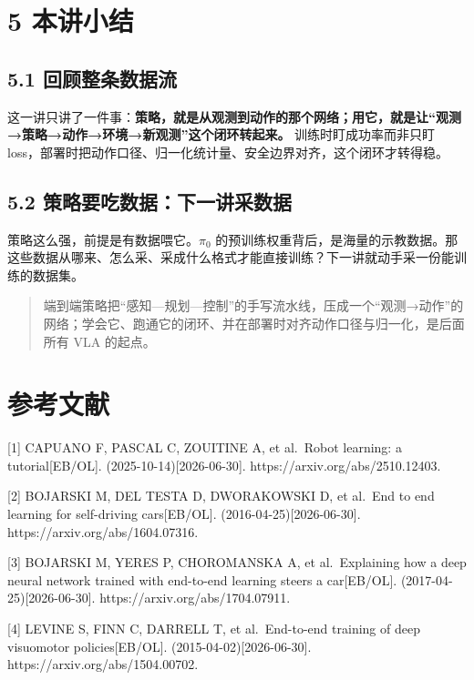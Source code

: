 \documentclass[
  chinese,
]{ctexart}
\begin{document}
\section{5 本讲小结}\label{ux672cux8bb2ux5c0fux7ed3}

\subsection{5.1
回顾整条数据流}\label{ux56deux987eux6574ux6761ux6570ux636eux6d41}

这一讲只讲了一件事：\textbf{策略，就是从观测到动作的那个网络；用它，就是让``观测→策略→动作→环境→新观测''这个闭环转起来。}
训练时盯成功率而非只盯
loss，部署时把动作口径、归一化统计量、安全边界对齐，这个闭环才转得稳。

\subsection{5.2
策略要吃数据：下一讲采数据}\label{ux7b56ux7565ux8981ux5403ux6570ux636eux4e0bux4e00ux8bb2ux91c7ux6570ux636e}

策略这么强，前提是有数据喂它。\(\pi_0\)
的预训练权重背后，是海量的示教数据。那这些数据从哪来、怎么采、采成什么格式才能直接训练？下一讲就动手采一份能训练的数据集。

\begin{quote}
端到端策略把``感知---规划---控制''的手写流水线，压成一个``观测→动作''的网络；学会它、跑通它的闭环、并在部署时对齐动作口径与归一化，是后面所有
VLA 的起点。
\end{quote}

\section{参考文献}\label{ux53c2ux8003ux6587ux732e}

{[}1{]} CAPUANO F, PASCAL C, ZOUITINE A, et al.~Robot learning: a
tutorial{[}EB/OL{]}. (2025-10-14){[}2026-06-30{]}.
https://arxiv.org/abs/2510.12403.

{[}2{]} BOJARSKI M, DEL TESTA D, DWORAKOWSKI D, et al.~End to end
learning for self-driving cars{[}EB/OL{]}. (2016-04-25){[}2026-06-30{]}.
https://arxiv.org/abs/1604.07316.

{[}3{]} BOJARSKI M, YERES P, CHOROMANSKA A, et al.~Explaining how a deep
neural network trained with end-to-end learning steers a car{[}EB/OL{]}.
(2017-04-25){[}2026-06-30{]}. https://arxiv.org/abs/1704.07911.

{[}4{]} LEVINE S, FINN C, DARRELL T, et al.~End-to-end training of deep
visuomotor policies{[}EB/OL{]}. (2015-04-02){[}2026-06-30{]}.
https://arxiv.org/abs/1504.00702.
\end{document}
